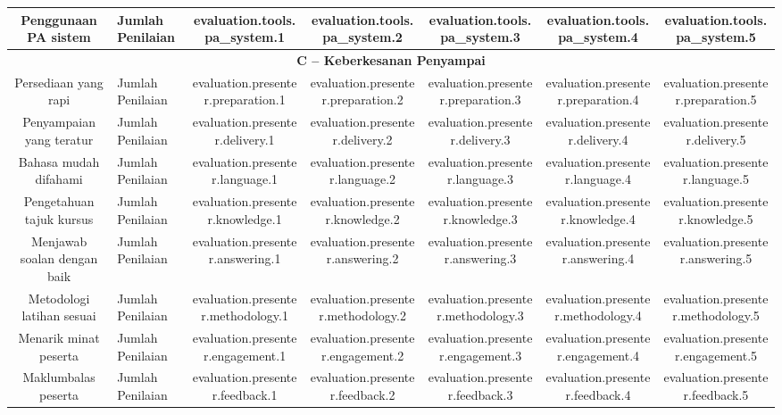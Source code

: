 \documentclass[a4paper,12pt]{article}
\begin{document}
\begin{tabular}{|c|p{6cm}|c|c|c|c|c|}
    \hline
    Penggunaan PA sistem & Jumlah Penilaian & {{evaluation.tools.pa_system.1}} & {{evaluation.tools.pa_system.2}} & {{evaluation.tools.pa_system.3}} & {{evaluation.tools.pa_system.4}} & {{evaluation.tools.pa_system.5}} \\
    \hline
    \multicolumn{7}{|c|}{\textbf{C – Keberkesanan Penyampai}} \\
    \hline
    Persediaan yang rapi & Jumlah Penilaian & {{evaluation.presenter.preparation.1}} & {{evaluation.presenter.preparation.2}} & {{evaluation.presenter.preparation.3}} & {{evaluation.presenter.preparation.4}} & {{evaluation.presenter.preparation.5}} \\
    \hline
    Penyampaian yang teratur & Jumlah Penilaian & {{evaluation.presenter.delivery.1}} & {{evaluation.presenter.delivery.2}} & {{evaluation.presenter.delivery.3}} & {{evaluation.presenter.delivery.4}} & {{evaluation.presenter.delivery.5}} \\
    \hline
    Bahasa mudah difahami & Jumlah Penilaian & {{evaluation.presenter.language.1}} & {{evaluation.presenter.language.2}} & {{evaluation.presenter.language.3}} & {{evaluation.presenter.language.4}} & {{evaluation.presenter.language.5}} \\
    \hline
    Pengetahuan tajuk kursus & Jumlah Penilaian & {{evaluation.presenter.knowledge.1}} & {{evaluation.presenter.knowledge.2}} & {{evaluation.presenter.knowledge.3}} & {{evaluation.presenter.knowledge.4}} & {{evaluation.presenter.knowledge.5}} \\
    \hline
    Menjawab soalan dengan baik & Jumlah Penilaian & {{evaluation.presenter.answering.1}} & {{evaluation.presenter.answering.2}} & {{evaluation.presenter.answering.3}} & {{evaluation.presenter.answering.4}} & {{evaluation.presenter.answering.5}} \\
    \hline
    Metodologi latihan sesuai & Jumlah Penilaian & {{evaluation.presenter.methodology.1}} & {{evaluation.presenter.methodology.2}} & {{evaluation.presenter.methodology.3}} & {{evaluation.presenter.methodology.4}} & {{evaluation.presenter.methodology.5}} \\
    \hline
    Menarik minat peserta & Jumlah Penilaian & {{evaluation.presenter.engagement.1}} & {{evaluation.presenter.engagement.2}} & {{evaluation.presenter.engagement.3}} & {{evaluation.presenter.engagement.4}} & {{evaluation.presenter.engagement.5}} \\
    \hline
    Maklumbalas peserta & Jumlah Penilaian & {{evaluation.presenter.feedback.1}} & {{evaluation.presenter.feedback.2}} & {{evaluation.presenter.feedback.3}} & {{evaluation.presenter.feedback.4}} & {{evaluation.presenter.feedback.5}} \\

\end{tabular}
\end{document}
